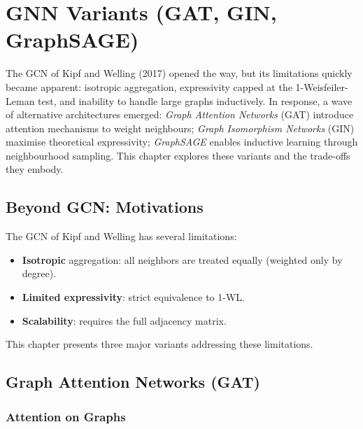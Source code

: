 \chapter{GNN Variants (GAT, GIN, GraphSAGE)}
\label{ch:variants}

The GCN of Kipf and Welling (2017) opened the way, but its limitations quickly became apparent: isotropic aggregation, expressivity capped at the 1-Weisfeiler-Leman test, and inability to handle large graphs inductively. In response, a wave of alternative architectures emerged: \emph{Graph Attention Networks} (GAT) introduce attention mechanisms to weight neighbours; \emph{Graph Isomorphism Networks} (GIN) maximise theoretical expressivity; \emph{GraphSAGE} enables inductive learning through neighbourhood sampling. This chapter explores these variants and the trade-offs they embody.

\section{Beyond GCN: Motivations}

The GCN of Kipf and Welling has several limitations:
\begin{itemize}
    \item \textbf{Isotropic} aggregation: all neighbors are treated equally
          (weighted only by degree).
    \item \textbf{Limited expressivity}: strict equivalence to 1-WL.
    \item \textbf{Scalability}: requires the full adjacency matrix.
\end{itemize}

This chapter presents three major variants addressing these limitations.

\section{Graph Attention Networks (GAT)}

\subsection{Attention on Graphs}

